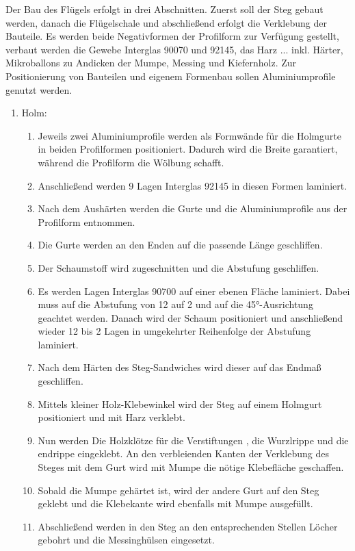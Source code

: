 Der Bau des Flügels erfolgt in drei Abschnitten. Zuerst soll der Steg gebaut werden, danach die Flügelschale und abschließend erfolgt die Verklebung der Bauteile.
Es werden beide Negativformen der Profilform zur Verfügung gestellt, verbaut werden die Gewebe Interglas 90070 und 92145, das Harz ... inkl. Härter, Mikroballons zu Andicken der Mumpe, Messing und Kiefernholz. Zur Positionierung von Bauteilen und eigenem Formenbau sollen Aluminiumprofile genutzt werden.

\begin{enumerate}
	\item Holm:
	\begin{enumerate}
		\item Jeweils zwei Aluminiumprofile werden als Formwände für die Holmgurte in beiden Profilformen positioniert. Dadurch wird die Breite garantiert, während die Profilform die Wölbung schafft.
		\item Anschließend werden 9 Lagen Interglas 92145 in diesen Formen laminiert. 
		\item Nach dem Aushärten werden die Gurte und die Aluminiumprofile aus der Profilform entnommen. 
		\item Die Gurte werden an den Enden auf die passende Länge geschliffen.
		\item Der Schaumstoff wird zugeschnitten und die Abstufung geschliffen.
		\item Es werden Lagen Interglas 90700 auf einer ebenen Fläche laminiert. Dabei muss auf die Abstufung von 12 auf 2 und auf die 45°-Ausrichtung geachtet werden. Danach wird der Schaum positioniert und anschließend wieder 12 bis 2 Lagen in umgekehrter Reihenfolge der Abstufung laminiert.
		\item Nach dem Härten des Steg-Sandwiches wird dieser auf das Endmaß geschliffen.
		\item Mittels kleiner Holz-Klebewinkel wird der Steg auf einem Holmgurt positioniert und mit Harz verklebt.
		\item Nun werden Die Holzklötze für die Verstiftungen , die Wurzlrippe und die endrippe eingeklebt. An den verbleienden Kanten der Verklebung des Steges mit dem Gurt wird mit Mumpe die nötige Klebefläche geschaffen.
		\item Sobald die Mumpe gehärtet ist, wird der andere Gurt auf den Steg geklebt und die Klebekante wird ebenfalls mit Mumpe ausgefüllt.
		\item Abschließend werden in den Steg an den entsprechenden Stellen Löcher gebohrt und die Messinghülsen eingesetzt.
	\end{enumerate}

\end{enumerate}
